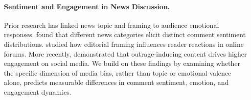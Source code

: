 \paragraph{Sentiment and Engagement in News Discussion.}
Prior research has linked news topic and framing to audience emotional responses.
\citet{reis2015breaking} found that different news categories elicit distinct comment sentiment distributions.
\citet{park2016supporting} studied how editorial framing influences reader reactions in online forums.
More recently, \citet{rathje2021out} demonstrated that outrage-inducing content drives higher engagement on social media.
We build on these findings by examining whether the specific dimension of media bias, rather than topic or emotional valence alone, predicts measurable differences in comment sentiment, emotion, and engagement dynamics.
